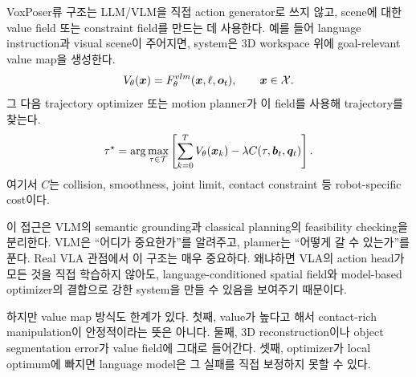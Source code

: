VoxPoser류 구조는 LLM/VLM을 직접 action generator로 쓰지 않고, scene에 대한 value field 또는 constraint field를 만드는 데 사용한다. 예를 들어 language instruction과 visual scene이 주어지면, system은 3D workspace 위에 goal-relevant value map을 생성한다.
\begin{equation}
  V_{\theta}(\bm{x})
  =
  F_{\theta}^{vlm}(\bm{x},\ell,\bm{o}_t),
  \qquad
  \bm{x}\in\mathcal{X}.
  \label{eq:value-map}
\end{equation}
그 다음 trajectory optimizer 또는 motion planner가 이 field를 사용해 trajectory를 찾는다.
\begin{equation}
  \tau^{\star}
  =
  \arg\max_{\tau \in \mathcal{T}}
  \left[
    \sum_{k=0}^{T} V_{\theta}(\bm{x}_k)
    -
    \lambda C(\tau,\bm{b}_t,\bm{q}_t)
  \right].
  \label{eq:value-map-planning}
\end{equation}
여기서 $C$는 collision, smoothness, joint limit, contact constraint 등 robot-specific cost이다.

이 접근은 VLM의 semantic grounding과 classical planning의 feasibility checking을 분리한다. VLM은 ``어디가 중요한가''를 알려주고, planner는 ``어떻게 갈 수 있는가''를 푼다. Real VLA 관점에서 이 구조는 매우 중요하다. 왜냐하면 VLA의 action head가 모든 것을 직접 학습하지 않아도, language-conditioned spatial field와 model-based optimizer의 결합으로 강한 system을 만들 수 있음을 보여주기 때문이다.

하지만 value map 방식도 한계가 있다. 첫째, value가 높다고 해서 contact-rich manipulation이 안정적이라는 뜻은 아니다. 둘째, 3D reconstruction이나 object segmentation error가 value field에 그대로 들어간다. 셋째, optimizer가 local optimum에 빠지면 language model은 그 실패를 직접 보정하지 못할 수 있다.

